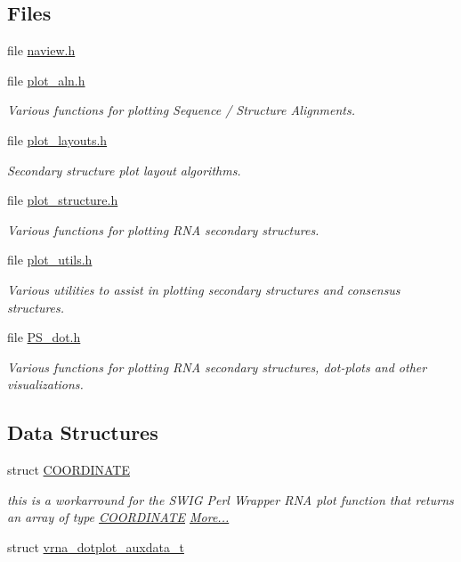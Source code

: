 \subsection*{Files}
\begin{DoxyCompactItemize}
\item 
file \mbox{\hyperlink{naview_8h}{naview.\+h}}
\item 
file \mbox{\hyperlink{plot__aln_8h}{plot\+\_\+aln.\+h}}
\begin{DoxyCompactList}\small\item\em Various functions for plotting Sequence / Structure Alignments. \end{DoxyCompactList}\item 
file \mbox{\hyperlink{plot__layouts_8h}{plot\+\_\+layouts.\+h}}
\begin{DoxyCompactList}\small\item\em Secondary structure plot layout algorithms. \end{DoxyCompactList}\item 
file \mbox{\hyperlink{plot__structure_8h}{plot\+\_\+structure.\+h}}
\begin{DoxyCompactList}\small\item\em Various functions for plotting R\+NA secondary structures. \end{DoxyCompactList}\item 
file \mbox{\hyperlink{plot__utils_8h}{plot\+\_\+utils.\+h}}
\begin{DoxyCompactList}\small\item\em Various utilities to assist in plotting secondary structures and consensus structures. \end{DoxyCompactList}\item 
file \mbox{\hyperlink{_p_s__dot_8h}{P\+S\+\_\+dot.\+h}}
\begin{DoxyCompactList}\small\item\em Various functions for plotting R\+NA secondary structures, dot-\/plots and other visualizations. \end{DoxyCompactList}\end{DoxyCompactItemize}
\subsection*{Data Structures}
\begin{DoxyCompactItemize}
\item 
struct \mbox{\hyperlink{group__plotting__utils_struct_c_o_o_r_d_i_n_a_t_e}{C\+O\+O\+R\+D\+I\+N\+A\+TE}}
\begin{DoxyCompactList}\small\item\em this is a workarround for the S\+W\+IG Perl Wrapper R\+NA plot function that returns an array of type \mbox{\hyperlink{group__plotting__utils_struct_c_o_o_r_d_i_n_a_t_e}{C\+O\+O\+R\+D\+I\+N\+A\+TE}}  \mbox{\hyperlink{group__plotting__utils_struct_c_o_o_r_d_i_n_a_t_e}{More...}}\end{DoxyCompactList}\item 
struct \mbox{\hyperlink{group__plotting__utils_structvrna__dotplot__auxdata__t}{vrna\+\_\+dotplot\+\_\+auxdata\+\_\+t}}
\end{DoxyCompactItemize}
